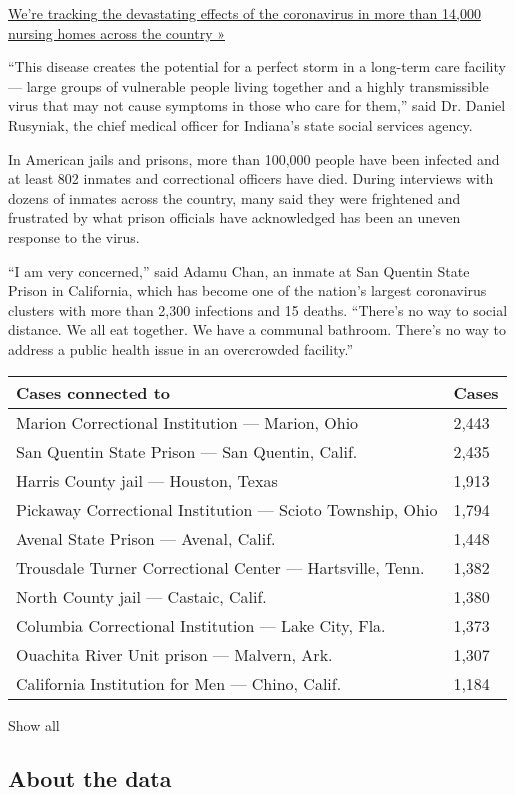 \href{https://www.nytimes.com/interactive/2020/us/coronavirus-nursing-homes.html}{We're
tracking the devastating effects of the coronavirus in more than 14,000
nursing homes across the country »}

``This disease creates the potential for a perfect storm in a long-term
care facility --- large groups of vulnerable people living together and
a highly transmissible virus that may not cause symptoms in those who
care for them,'' said Dr. Daniel Rusyniak, the chief medical officer for
Indiana's state social services agency.

In American jails and prisons, more than 100,000 people have been
infected and at least 802 inmates and correctional officers have died.
During interviews with dozens of inmates across the country, many said
they were frightened and frustrated by what prison officials have
acknowledged has been an uneven response to the virus.

``I am very concerned,'' said Adamu Chan, an inmate at San Quentin State
Prison in California, which has become one of the nation's largest
coronavirus clusters with more than 2,300 infections and 15 deaths.
``There's no way to social distance. We all eat together. We have a
communal bathroom. There's no way to address a public health issue in an
overcrowded facility.''

\begin{longtable}[]{@{}ll@{}}
\toprule
Cases connected to & Cases\tabularnewline
\midrule
\endhead
Marion Correctional Institution --- Marion, Ohio & 2,443 \tabularnewline
San Quentin State Prison --- San Quentin, Calif. & 2,435 \tabularnewline
Harris County jail --- Houston, Texas & 1,913 \tabularnewline
Pickaway Correctional Institution --- Scioto Township, Ohio & 1,794
\tabularnewline
Avenal State Prison --- Avenal, Calif. & 1,448 \tabularnewline
Trousdale Turner Correctional Center --- Hartsville, Tenn. & 1,382
\tabularnewline
North County jail --- Castaic, Calif. & 1,380 \tabularnewline
Columbia Correctional Institution --- Lake City, Fla. & 1,373
\tabularnewline
Ouachita River Unit prison --- Malvern, Ark. & 1,307 \tabularnewline
California Institution for Men --- Chino, Calif. & 1,184 \tabularnewline
\bottomrule
\end{longtable}

Show all

\hypertarget{about-the-data}{%
\subsection{About the data}\label{about-the-data}}

